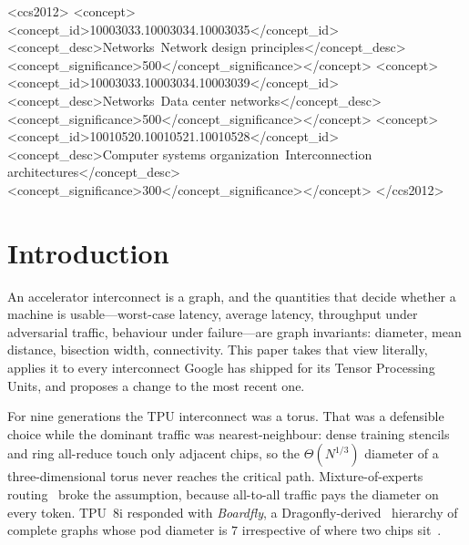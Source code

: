 \documentclass[sigconf,nonacm]{acmart}
\theoremstyle{acmdefinition}%
\begin{document}
\begin{CCSXML}
<ccs2012>
<concept><concept_id>10003033.10003034.10003035</concept_id>
<concept_desc>Networks~Network design principles</concept_desc>
<concept_significance>500</concept_significance></concept>
<concept><concept_id>10003033.10003034.10003039</concept_id>
<concept_desc>Networks~Data center networks</concept_desc>
<concept_significance>500</concept_significance></concept>
<concept><concept_id>10010520.10010521.10010528</concept_id>
<concept_desc>Computer systems organization~Interconnection
architectures</concept_desc>
<concept_significance>300</concept_significance></concept>
</ccs2012>
\end{CCSXML}



\maketitle

\section{Introduction}

An accelerator interconnect is a graph, and the quantities that decide whether a
machine is usable---worst-case latency, average latency, throughput under
adversarial traffic, behaviour under failure---are graph invariants: diameter,
mean distance, bisection width, connectivity. This paper takes that view
literally, applies it to every interconnect Google has shipped for its Tensor
Processing Units, and proposes a change to the most recent one.

For nine generations the TPU interconnect was a torus. That was a defensible
choice while the dominant traffic was nearest-neighbour: dense training stencils
and ring all-reduce touch only adjacent chips, so the $\Theta(N^{1/3})$ diameter
of a three-dimensional torus never reaches the critical path. Mixture-of-experts
routing~\cite{shazeer2017moe} broke the assumption, because all-to-all traffic
pays the diameter on every token. TPU~8i responded with \emph{Boardfly}, a
Dragonfly-derived~\cite{kim2008dragonfly} hierarchy of complete graphs whose pod
diameter is $7$ irrespective of where two chips sit~\cite{google2026tpu8}.
\end{document}

